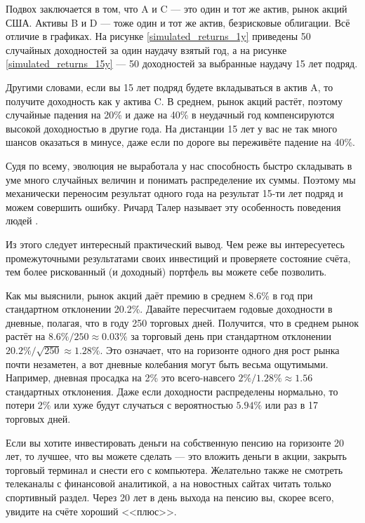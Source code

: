 Подвох заключается в том, что A и C --- это один и тот же актив, рынок акций США. Активы B и D --- тоже один и тот же актив, безрисковые облигации. Всё отличие в графиках. На рисунке \ref{simulated_returns_1y} приведены 50 случайных доходностей за один наудачу взятый год, а на рисунке \ref{simulated_returns_15y} --- 50 доходностей за выбранные наудачу 15 лет подряд.

Другими словами, если вы 15 лет подряд будете вкладываться в актив A, то получите доходность как у актива C. В среднем, рынок акций растёт, поэтому случайные падения на 20\% и даже на 40\% в неудачный год компенсируются высокой доходностью в другие года. На дистанции 15 лет у вас не так много шансов оказаться в минусе, даже если по дороге вы переживёте падение на 40\%.

Судя по всему, эволюция не выработала у нас способность быстро складывать в уме много случайных величин и понимать распределение их суммы. Поэтому мы механически переносим результат одного года на результат 15-ти лет подряд и можем совершить ошибку. Ричард Талер называет эту особенность поведения людей  \cite{benartzi1995myopic}\cite[ch.~20]{thaler2015misbehaving}.

Из этого следует интересный практический вывод. Чем реже вы интересуетесь промежуточными результатами своих инвестиций и проверяете состояние счёта, тем более рискованный (и доходный) портфель вы можете себе позволить.

Как мы выяснили, рынок акций даёт премию в среднем 8.6\% в год при стандартном отклонении 20.2\%. Давайте пересчитаем годовые доходности в дневные, полагая, что в году 250 торговых дней. Получится, что в среднем рынок растёт на
$8.6\% / 250 \approx 0.03\%$ за торговый день при стандартном отклонении $20.2\% / \sqrt{250} \approx 1.28\%$. Это означает, что на горизонте одного дня рост рынка почти незаметен, а вот дневные колебания могут быть весьма ощутимыми. Например, дневная просадка на 2\% это всего-навсего $2\%/1.28\% \approx 1.56$ стандартных отклонения. Даже если доходности распределены нормально, то потери 2\% или хуже будут случаться с вероятностью $5.94\%$ или раз в 17 торговых дней.

Если вы хотите инвестировать деньги на собственную пенсию на горизонте 20 лет, то лучшее, что вы можете сделать --- это вложить деньги в акции, закрыть торговый терминал и снести его с компьютера. Желательно также не смотреть телеканалы с финансовой аналитикой, а на новостных сайтах читать только спортивный раздел. Через 20 лет в день выхода на пенсию вы, скорее всего, увидите на счёте хороший <<плюс>>.

